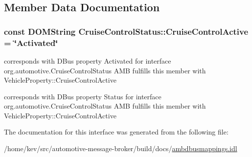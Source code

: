 \subsection{Member Data Documentation}
\hypertarget{interfaceCruiseControlStatus_a53b67edfb476d0fb49919d6f831ef7ac}{
\subsubsection[{Cruise\+Control\+Active}]{\setlength{\rightskip}{0pt plus 5cm}const D\+O\+M\+String Cruise\+Control\+Status\+::\+Cruise\+Control\+Active = \char`\"{}Activated\char`\"{}}}\label{interfaceCruiseControlStatus_a53b67edfb476d0fb49919d6f831ef7ac}


corresponds with D\+Bus property Activated for interface org.\+automotive.\+Cruise\+Control\+Status A\+M\+B fulfills this member with Vehicle\+Property\+::\+Cruise\+Control\+Active 

corresponds with D\+Bus property Status for interface org.\+automotive.\+Cruise\+Control\+Status A\+M\+B fulfills this member with Vehicle\+Property\+::\+Cruise\+Control\+Active 

The documentation for this interface was generated from the following file\+:\begin{DoxyCompactItemize}
\item 
/home/kev/src/automotive-\/message-\/broker/build/docs/\hyperlink{ambdbusmappings_8idl}{ambdbusmappings.\+idl}\end{DoxyCompactItemize}
